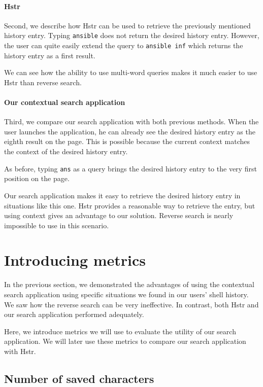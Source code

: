 \paragraph{Hstr}
Second, we describe how Hstr can be used to retrieve the previously mentioned history entry.
Typing \verb|ansible| does not return the desired history entry. However, the user can quite easily extend the query to \verb|ansible inf| which returns the history entry as a first result. 

We can see how the ability to use multi-word queries makes it much easier to use Hstr than reverse search.

\paragraph{Our contextual search application}

Third, we compare our search application with both previous methods. 
When the user launches the application, he can already see the desired history entry as the eighth result on the page. This is possible because the current context matches the context of the desired history entry. 

As before, typing \verb|ans| as a query brings the desired history entry to the very first position on the page. 

Our search application makes it easy to retrieve the desired history entry in situations like this one. Hstr provides a reasonable way to retrieve the entry, but using context gives an advantage to our solution. Reverse search is nearly impossible to use in this scenario.

\section{Introducing metrics}

In the previous section, we demonstrated the advantages of using the contextual search application using specific situations we found in our users' shell history. We saw how the reverse search can be very ineffective. In contrast, both Hstr and our search application performed adequately.

Here, we introduce metrics we will use to evaluate the utility of our search application. We will later use these metrics to compare our search application with Hstr. 

\subsection{Number of saved characters}

